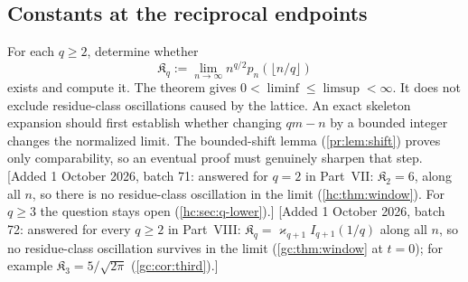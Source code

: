 \documentclass[11pt,a4paper]{article}
\theoremstyle{definition}\newaliascnt{definition}{theorem}
\theoremstyle{remark}\newaliascnt{remark}{theorem}
\begin{document}
\subsection{Constants at the reciprocal endpoints}
\label{pr:sec:q-endpoints}
For each $q\ge2$, determine whether
\[
 \mathfrak K_q:=\lim_{n\to\infty}n^{q/2}p_n(\lfloor n/q\rfloor)
\]
exists and compute it. The theorem gives $0<\liminf\le\limsup<\infty$. It
does not exclude residue-class oscillations caused by the lattice. An exact
skeleton expansion should first establish whether changing $qm-n$ by a
bounded integer changes the normalized limit. The bounded-shift lemma
(\cref{pr:lem:shift}) proves only comparability, so an eventual proof must
genuinely sharpen that step.
[Added 1 October 2026, batch 71: answered for $q=2$ in Part~VII:
$\mathfrak K_2=6$, along all $n$, so there is no residue-class oscillation
in the limit (\cref{hc:thm:window}). For $q\ge3$ the question stays open
(\cref{hc:sec:q-lower}).]
[Added 1 October 2026, batch 72: answered for every $q\ge2$ in Part~VIII:
$\mathfrak K_q=\varkappa_{q+1}I_{q+1}(1/q)$ along all $n$, so no residue-class
oscillation survives in the limit (\cref{gc:thm:window} at $t=0$); for
example $\mathfrak K_3=5/\sqrt{2\pi}$ (\cref{gc:cor:third}).]
\end{document}
